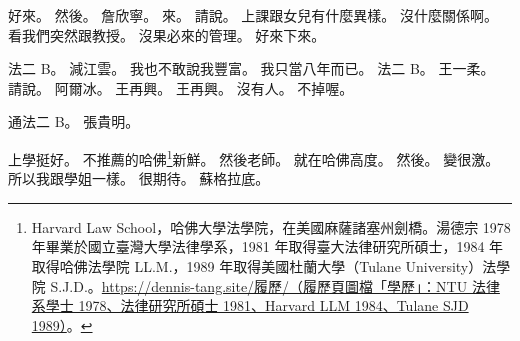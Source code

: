 \hypertarget{c01:cue:2332}{}好來。
\hypertarget{c01:cue:2333}{}然後。
\hypertarget{c01:cue:2334}{}詹欣寧。
\hypertarget{c01:cue:2335}{}來。
\hypertarget{c01:cue:2336}{}請說。
\hypertarget{c01:cue:2337}{}上課跟女兒有什麼異樣。
\hypertarget{c01:cue:2338}{}沒什麼關係啊。
\hypertarget{c01:cue:2339}{}看我們突然跟教授。
\hypertarget{c01:cue:2340}{}沒果必來的管理。
\hypertarget{c01:cue:2341}{}好來下來。

\hypertarget{c01:cue:2342}{}法二 B。
\hypertarget{c01:cue:2343}{}減江雲。
\hypertarget{c01:cue:2344}{}我也不敢說我豐富。
\hypertarget{c01:cue:2345}{}我只當八年而已。
\hypertarget{c01:cue:2346}{}法二 B。
\hypertarget{c01:cue:2347}{}王一柔。
\hypertarget{c01:cue:2348}{}請說。
\hypertarget{c01:cue:2349}{}阿爾冰。
\hypertarget{c01:cue:2350}{}王再興。
\hypertarget{c01:cue:2351}{}王再興。
\hypertarget{c01:cue:2352}{}沒有人。
\hypertarget{c01:cue:2353}{}不掉喔。

\hypertarget{c01:cue:2354}{}通法二 B。
\hypertarget{c01:cue:2355}{}張貴明。

\hypertarget{c01:cue:2356}{}上學挺好。
\hypertarget{c01:cue:2357}{}不推薦的哈佛\footnote{Harvard Law School，哈佛大學法學院，在美國麻薩諸塞州劍橋。湯德宗 1978 年畢業於國立臺灣大學法律學系，1981 年取得臺大法律研究所碩士，1984 年取得哈佛法學院 LL.M.，1989 年取得美國杜蘭大學（Tulane University）法學院 S.J.D.。\href{https://dennis-tang.site/\%E5\%B1\%A5\%E6\%AD\%B7/\%EF\%BC\%88\%E5\%B1\%A5\%E6\%AD\%B7\%E9\%A0\%81\%E5\%9C\%96\%E6\%AA\%94\%E3\%80\%8C\%E5\%AD\%B8\%E6\%AD\%B7\%E3\%80\%8D\%EF\%BC\%9ANTU\%20\%E6\%B3\%95\%E5\%BE\%8B\%E7\%B3\%BB\%E5\%AD\%B8\%E5\%A3\%AB\%201978\%E3\%80\%81\%E6\%B3\%95\%E5\%BE\%8B\%E7\%A0\%94\%E7\%A9\%B6\%E6\%89\%80\%E7\%A2\%A9\%E5\%A3\%AB\%201981\%E3\%80\%81Harvard\%20LLM\%201984\%E3\%80\%81Tulane\%20SJD\%201989\%EF\%BC\%89}{https://dennis-tang.site/履歷/（履歷頁圖檔「學歷」：NTU 法律系學士 1978、法律研究所碩士 1981、Harvard LLM 1984、Tulane SJD 1989）}。}新鮮。
\hypertarget{c01:cue:2358}{}然後老師。
\hypertarget{c01:cue:2359}{}就在哈佛高度。
\hypertarget{c01:cue:2360}{}然後。
\hypertarget{c01:cue:2361}{}變很激。
\hypertarget{c01:cue:2362}{}所以我跟學姐一樣。
\hypertarget{c01:cue:2363}{}很期待。
\hypertarget{c01:cue:2364}{}蘇格拉底。


